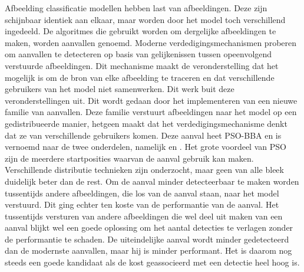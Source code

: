 \begin{abstract*}
Afbeelding classificatie modellen hebben last van  afbeeldingen. Deze zijn schijnbaar identiek aan elkaar, maar worden door het model toch verschillend ingedeeld. De algoritmes die gebruikt worden om dergelijke  afbeeldingen te maken, worden  aanvallen genoemd. Moderne verdedigingsmechanismen proberen om aanvallen te detecteren op basis van gelijkenissen tussen opeenvolgend verstuurde afbeeldingen. Dit mechanisme maakt de veronderstelling dat het mogelijk is om de bron van elke afbeelding te traceren en dat verschillende gebruikers van het model niet samenwerken. Dit werk buit deze veronderstellingen uit. Dit wordt gedaan door het implementeren van een nieuwe familie van  aanvallen. Deze familie verstuurt afbeeldingen naar het model op een gedistribueerde manier, hetgeen maakt dat het verdedigingsmechanisme denkt dat ze van verschillende gebruikers komen. Deze aanval heet PSO-BBA en is vernoemd naar de twee onderdelen, namelijk  en  \cite{brunner_guessing_2019}. Het grote voordeel van PSO zijn de meerdere startposities waarvan de aanval gebruik kan maken. Verschillende distributie technieken zijn onderzocht, maar geen van alle bleek duidelijk beter dan de rest. Om de aanval minder detecteerbaar te maken worden tussentijds andere afbeeldingen, die los van de aanval staan, naar het model verstuurd. Dit ging echter ten koste van de performantie van de aanval. Het tussentijds versturen van andere afbeeldingen die wel deel uit maken van een aanval blijkt wel een goede oplossing om het aantal detecties te verlagen zonder de performantie te schaden. De uiteindelijke aanval wordt minder gedetecteerd dan de modernste aanvallen, maar hij is minder performant. Het is daarom nog steeds een goede kandidaat als de kost geassocieerd met een detectie heel hoog is.
\end{abstract*}
